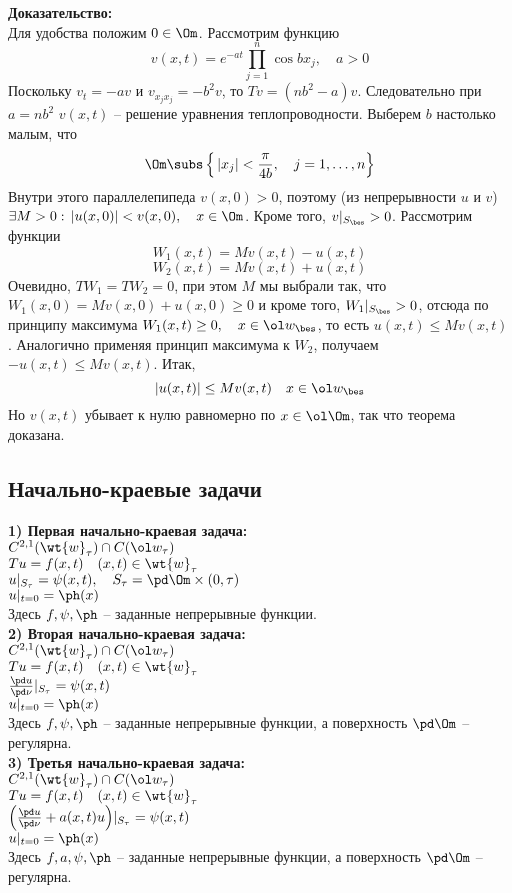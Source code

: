 \documentclass[a4paper,draft]{article}
\begin{document}
\noindent\textbf{Доказательство:}\\
Для удобства положим $0\in\Om$. Рассмотрим функцию
$$
v(x,t)=e^{-at}\prod_{j=1}^n \cos b x_j,\quad a>0
$$
Поскольку $v_t=-av$ и $v_{x_j x_j}=-b^2 v$, то $Tv=(nb^2-a)v$.
Следовательно при $a=nb^2$ $v(x,t)$ -- решение уравнения
теплопроводности. Выберем $b$ настолько малым, что
$$
\Om\subs \left\{\,|x_j|<\frac \pi{4b},\quad j=1,\ldots,n
\right\}
$$
Внутри этого параллелепипеда $v(x,0)>0$, поэтому (из непрерывности
$u$ и $v$) $\exists M>0:\, |u(x,0)|<v(x,0),\quad x\in\Om$.
Кроме того, $v|_{S_\bes}>0$. Рассмотрим функции
$$
W_1(x,t)=Mv(x,t)-u(x,t)
$$
$$
W_2(x,t)=Mv(x,t)+u(x,t)
$$
Очевидно, $TW_1=TW_2=0$, при этом $M$ мы выбрали так, что
$W_1(x,0)=Mv(x,0)+u(x,0)\ge 0$ и кроме того, $W_1|_{S_\bes}>0$,
отсюда по принципу максимума $W_1(x,t)\ge 0,\quad x\in \ol
w_\bes$, то есть $u(x,t)\le Mv(x,t)$. Аналогично применяя
принцип максимума к $W_2$, получаем $-u(x,t)\le Mv(x,t)$. Итак,
$$
|u(x,t)| \le Mv(x,t)\quad x\in \ol w_\bes
$$
Но $v(x,t)$ убывает к нулю равномерно по $x\in\ol\Om$,
так что теорема доказана.\\

\subsection {Начально-краевые задачи}
\textbf{1) Первая начально-краевая задача:}\\
$C^{2,1}(\wt{w}_\tau)\cap C(\ol w_\tau)$\\
$Tu=f(x,t)\quad (x,t)\in \wt{w}_\tau$\\
$u|_{S_\tau}=\psi(x,t),\quad
S_\tau=\pd\Om\times(0,\tau)$\\
$u|_{t=0}=\ph(x)$\\
Здесь $f,\psi,\ph$ -- заданные непрерывные функции.\\

\textbf{2) Вторая начально-краевая задача:}\\
$C^{2,1}(\wt{w}_\tau)\cap C(\ol w_\tau)$\\
$Tu=f(x,t)\quad (x,t)\in \wt{w}_\tau$\\
$\frac{\pd u}{\pd \nu}|_{S_\tau}=\psi(x,t)$\\
$u|_{t=0}=\ph(x)$\\
Здесь $f,\psi,\ph$ -- заданные непрерывные функции, а
поверхность $\pd\Om$ -- регулярна.\\

\textbf{3) Третья начально-краевая задача:}\\
$C^{2,1}(\wt{w}_\tau)\cap C(\ol w_\tau)$\\
$Tu=f(x,t)\quad (x,t)\in \wt{w}_\tau$\\
$\Bigl( \frac{\pd u}{\pd \nu}+a(x,t)u\Bigr)|_{S_\tau}=\psi(x,t)$\\
$u|_{t=0}=\ph(x)$\\
Здесь $f,a,\psi,\ph$ -- заданные непрерывные функции, а
поверхность $\pd\Om$ -- регулярна.\\
\end{document}
